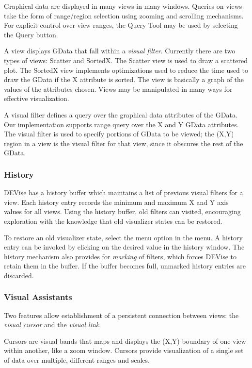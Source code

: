 Graphical data are displayed in many views in many windows. Queries on views
take the form of range/region selection using zooming and scrolling
mechanisms. For explicit control over view ranges, the Query Tool may be used
by selecting the Query button.

A view displays GData that fall within a {\em visual filter}. Currently there
are two types of views: Scatter and SortedX. The Scatter view is used to draw a
scattered plot. The SortedX view implements optimizations used to reduce the
time used to draw the GData if the X attribute is sorted. The view is basically
a graph of the values of the attributes chosen. Views may be manipulated in many
ways for effective visualization.

A visual filter defines a query over the graphical data attributes of the
GData. Our implementation supports range query over the X and Y GData
attributes. The visual filter is used to specify portions of GData to be viewed;
the (X,Y) region in a view is the visual filter for that view, since it obscures
the rest of the GData.

\subsubsection{History}

DEVise has a history buffer which maintains a list of previous visual filters
for a view. Each history entry records the minimum and maximum X and Y axis
values for all views. Using the history buffer, old filters can visited,
encouraging exploration with the knowledge that old visualizer states can be
restored.

To restore an old visualizer state, select the  menu option in the
 menu. A history entry can be invoked by clicking on the desired
value in the history window. The history mechanism also provides for {\em
marking} of filters, which forces DEVise to retain them in the buffer. If the
buffer becomes full, unmarked history entries are discarded.

\subsubsection{Visual Assistants}

Two features allow establishment of a persistent connection between views: the
{\em visual cursor} and the {\em visual link}.

Cursors are visual bands that maps and displays the (X,Y) boundary of one view
within another, like a zoom window. Cursors provide visualization of a single set of data over multiple, different ranges and scales.

